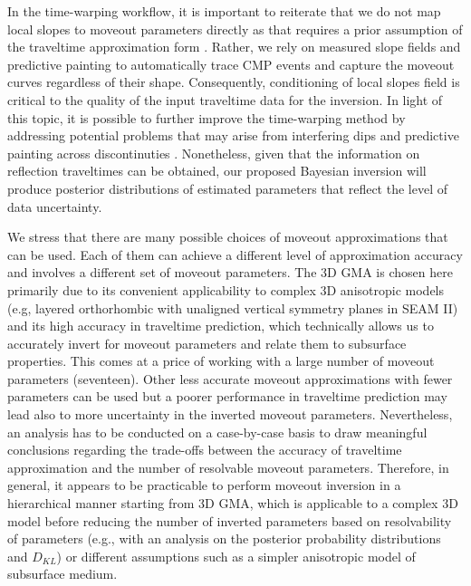 In the time-warping workflow, it is important to reiterate that we do not map local slopes to moveout parameters directly as that requires a prior assumption of the traveltime approximation form \cite[]{mapping}. Rather, we rely on measured slope fields and predictive painting to automatically trace CMP events and capture the moveout curves regardless of their shape. Consequently, conditioning of local slopes field is critical to the quality of the input traveltime data for the inversion. In light of this topic, it is possible to further improve the time-warping method by addressing potential problems that may arise from interfering dips \cite[]{schleicherdip} and predictive painting across discontinuties \cite[]{paintfault}. Nonetheless, given that the information on reflection traveltimes can be obtained, our proposed Bayesian inversion will produce posterior distributions of estimated parameters that reflect the level of data uncertainty.



We stress that there are many possible choices of moveout approximations that can be used. Each of them can achieve a different level of approximation accuracy and involves a different set of moveout parameters. The 3D GMA is chosen here primarily due to its convenient applicability to complex 3D anisotropic models (e.g, layered orthorhombic with unaligned vertical symmetry planes in SEAM II) and its high accuracy in traveltime prediction, which technically allows us to accurately invert for moveout parameters and relate them to subsurface properties. This comes at a price of working with a large number of moveout parameters (seventeen). Other less accurate moveout approximations with fewer parameters can be used but a poorer performance in traveltime prediction may lead also to more uncertainty in the inverted moveout parameters. Nevertheless, an analysis has to be conducted on a case-by-case basis to draw meaningful conclusions regarding the trade-offs between the accuracy of traveltime approximation and the number of resolvable moveout parameters. Therefore, in general, it appears to be practicable to perform moveout inversion in a hierarchical manner starting from 3D GMA, which is applicable to a complex 3D model before reducing the number of inverted parameters based on resolvability of parameters (e.g., with an analysis on the posterior probability distributions and $D_{KL}$) or different assumptions such as a simpler anisotropic model of subsurface medium.

